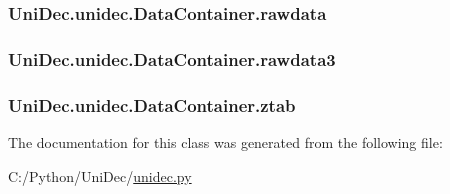\subsubsection[{rawdata}]{\setlength{\rightskip}{0pt plus 5cm}Uni\+Dec.\+unidec.\+Data\+Container.\+rawdata}\label{class_uni_dec_1_1unidec_1_1_data_container_aacbbbe6af1496772a23c81a734cb890f}
\hypertarget{class_uni_dec_1_1unidec_1_1_data_container_a9353af169ad1af4456c3df979a19f967}{}
\subsubsection[{rawdata3}]{\setlength{\rightskip}{0pt plus 5cm}Uni\+Dec.\+unidec.\+Data\+Container.\+rawdata3}\label{class_uni_dec_1_1unidec_1_1_data_container_a9353af169ad1af4456c3df979a19f967}
\hypertarget{class_uni_dec_1_1unidec_1_1_data_container_ad3062e24b198c97058428910ee0a0f89}{}
\subsubsection[{ztab}]{\setlength{\rightskip}{0pt plus 5cm}Uni\+Dec.\+unidec.\+Data\+Container.\+ztab}\label{class_uni_dec_1_1unidec_1_1_data_container_ad3062e24b198c97058428910ee0a0f89}


The documentation for this class was generated from the following file\+:\begin{DoxyCompactItemize}
\item 
C\+:/\+Python/\+Uni\+Dec/\hyperlink{unidec_8py}{unidec.\+py}\end{DoxyCompactItemize}

